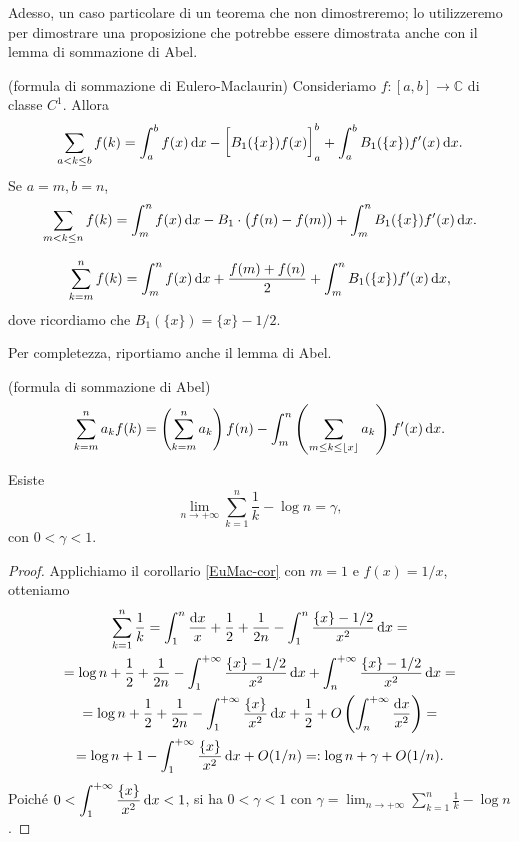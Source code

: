Adesso, un caso particolare di un teorema che non dimostreremo; lo utilizzeremo per dimostrare una proposizione che potrebbe essere dimostrata anche con il lemma di sommazione di Abel.

\begin{thm}
  (formula di sommazione di Eulero-Maclaurin) Consideriamo $f:[a,b] \longrightarrow \mathbb{C}$ di classe $C^1$. Allora
  $$\sum_{a<k \le b}f(k)=\int_a^b f(x)\mathop{}\!\mathrm{d} x-\bigg[B_1(\{x\})f(x)\bigg]_a^b+\int_a^b B_1(\{x\})f'(x)\mathop{}\!\mathrm{d} x.$$
  Se $a=m, b=n$,
  $$\sum_{m<k \le n} f(k)=\int_m^nf(x)\mathop{}\!\mathrm{d} x-B_1\cdot\big(f(n)-f(m)\big)+\int_m^n B_1(\{x\})f'(x)\mathop{}\!\mathrm{d} x.$$
\end{thm}

\begin{cor} \label{EuMac-cor}
  $$\sum_{k=m}^n f(k)=\int_m^n f(x)\mathop{}\!\mathrm{d} x+\frac{f(m)+f(n)}{2}+\int_m^n B_1(\{x\})f'(x)\mathop{}\!\mathrm{d} x,$$
  dove ricordiamo che $B_1(\{x\})=\{x\}-1/2$.
\end{cor}

Per completezza, riportiamo anche il lemma di Abel.

\begin{lm}
  (formula di sommazione di Abel)
  $$\sum_{k=m}^n a_kf(k)=\left(\sum_{k=m}^n a_k\right)f(n)-\int_m^n\left(\sum_{m \le k \le \lfloor x \rfloor}a_k\right)f'(x)\mathop{}\!\mathrm{d} x.$$
\end{lm}

\begin{prop}
  Esiste
  $$\lim_{n \longrightarrow +\infty} \sum_{k=1}^n \frac{1}{k}-\log{n}=\gamma,$$
  con $0<\gamma<1$.
\end{prop}

\begin{proof}
  Applichiamo il corollario \ref{EuMac-cor} con $m=1$ e $f(x)=1/x$, otteniamo
  \begin{gather*}
    \sum_{k=1}^n \frac{1}{k}=\int_1^n \frac{\mathop{}\!\mathrm{d} x}{x}+\frac{1}{2}+\frac{1}{2n}-\int_1^n \frac{\{x\}-1/2}{x^2}\mathop{}\!\mathrm{d} x= \\
    =\log{n}+\frac{1}{2}+\frac{1}{2n}-\int_1^{+\infty} \frac{\{x\}-1/2}{x^2}\mathop{}\!\mathrm{d} x+\int_n^{+\infty}\frac{\{x\}-1/2}{x^2}\mathop{}\!\mathrm{d} x= \\
    =\log{n}+\frac{1}{2}+\frac{1}{2n}-\int_1^{+\infty} \frac{\{x\}}{x^2}\mathop{}\!\mathrm{d} x+\frac{1}{2}+O\left(\int_n^{+\infty}\frac{\mathop{}\!\mathrm{d} x}{x^2}\right)= \\
    =\log{n}+1-\int_1^{+\infty} \frac{\{x\}}{x^2}\mathop{}\!\mathrm{d} x+O(1/n)=:\log{n}+\gamma+O(1/n).
  \end{gather*}
  Poiché $\displaystyle 0<\int_1^{+\infty} \frac{\{x\}}{x^2}\mathop{}\!\mathrm{d} x<1$, si ha $0<\gamma<1$ con $\displaystyle \gamma=\lim_{n \longrightarrow +\infty} \sum_{k=1}^n \frac{1}{k}-\log{n}$.
\end{proof}

